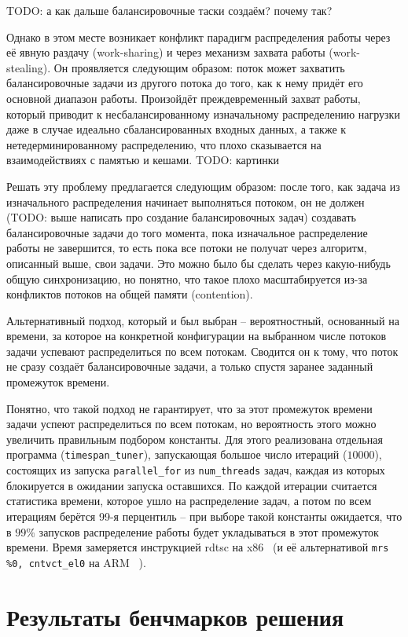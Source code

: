 \documentclass[times,specification,annotation]{itmo-student-thesis}
\begin{document}
TODO: а как дальше балансировочные таски создаём? почему так?

Однако в этом месте возникает конфликт парадигм распределения работы через её явную раздачу (work-sharing) и через механизм захвата работы (work-stealing). Он проявляется следующим образом: поток может захватить балансировочные задачи из другого потока до того, как к нему придёт его основной диапазон работы. Произойдёт преждевременный захват работы, который приводит к несбалансированному изначальному распределению нагрузки даже в случае идеально сбалансированных входных данных, а также к нетедерминированному распределению, что плохо сказывается на взаимодействиях с памятью и кешами.
TODO:  картинки

Решать эту проблему предлагается следующим образом: после того, как задача из изначального распределения начинает выполняться потоком, он не должен (TODO: выше написать про создание балансировочных задач) создавать балансировочные задачи до того момента, пока изначальное распределение работы не завершится, то есть пока все потоки не получат через алгоритм, описанный выше, свои задачи. Это можно было бы сделать через какую-нибудь общую синхронизацию, но понятно, что такое плохо масштабируется из-за конфликтов потоков на общей памяти (contention).

Альтернативный подход, который и был выбран -- вероятностный, основанный на времени, за которое на конкретной конфигурации на выбранном числе потоков задачи успевают распределиться по всем потокам. Сводится он к тому, что поток не сразу создаёт балансировочные задачи, а только спустя заранее заданный промежуток времени.

Понятно, что такой подход не гарантирует, что за этот промежуток времени задачи успеют распределиться по всем потокам, но вероятность этого можно увеличить правильным подбором константы. Для этого реализована отдельная программа (\texttt{timespan\_tuner}), запускающая большое число итераций ($10000$), состоящих из запуска \texttt{parallel\_for} из \texttt{num\_threads} задач, каждая из которых блокируется в ожидании запуска оставшихся. По каждой итерации считается статистика времени, которое ушло на распределение задач, а потом по всем итерациям берётся 99-я перцентиль -- при выборе такой константы ожидается, что в $99\%$ запусков распределение работы будет укладываться в этот промежуток времени. Время замеряется инструкцией rdtsc на x86~\cite{rdtsc} (и её альтернативой \texttt{mrs \%0, cntvct\_el0} на ARM ~\cite{rdtsc-arm}).

\section{Результаты бенчмарков решения}
\end{document}
